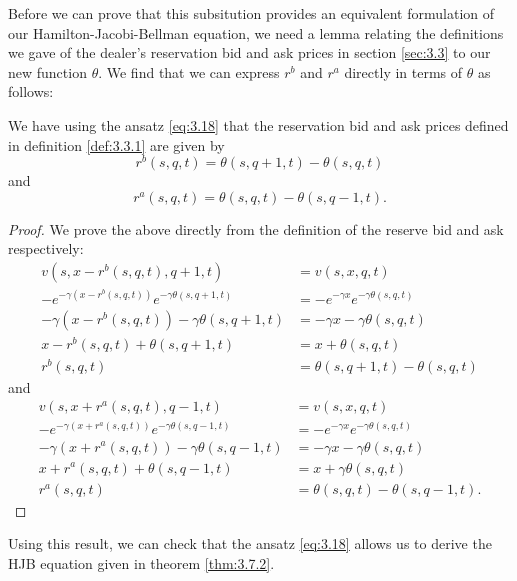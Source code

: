 Before we can prove that this subsitution provides an equivalent formulation of our
Hamilton-Jacobi-Bellman equation, we need a lemma relating the definitions we gave
of the dealer's reservation bid and ask prices in section \ref{sec:3.3} to our new
function $\theta$. We find that we can express $r^b$ and $r^a$ directly in terms of 
$\theta$ as follows:
\begin{lemma}\label{lem:3.7.3}
    We have using the ansatz \ref{eq:3.18} that the reservation bid and ask prices
    defined in definition \ref{def:3.3.1} are given by
    \begin{equation}
        r^b(s,q,t)=\theta(s,q+1,t)-\theta(s,q,t)
    \end{equation}
    and
    \begin{equation}
        r^a(s,q,t)=\theta(s,q,t)-\theta(s,q-1,t).
    \end{equation}
\end{lemma}
\begin{proof}
    We prove the above directly from the definition of the reserve bid and ask 
    respectively:
    \begin{align*}
        v(s,x-r^b(s,q,t),q+1,t)&=v(s,x,q,t)\\
        -e^{-\gamma(x-r^b(s,q,t))}e^{-\gamma\theta(s,q+1,t)}&=-e^{-\gamma x}e^{-\gamma\theta(s,q,t)}\\
        -\gamma(x-r^b(s,q,t))-\gamma\theta(s,q+1,t)&=-\gamma x-\gamma\theta(s,q,t)\\
        x-r^b(s,q,t)+\theta(s,q+1,t)&=x+\theta(s,q,t)\\
        r^b(s,q,t)&=\theta(s,q+1,t)-\theta(s,q,t)
    \end{align*}
    and
    \begin{align*}
        v(s,x+r^a(s,q,t),q-1,t)&=v(s,x,q,t)\\
        -e^{-\gamma(x+r^a(s,q,t))}e^{-\gamma\theta(s,q-1,t)}&=-e^{-\gamma x}e^{-\gamma\theta(s,q,t)}\\
        -\gamma(x+r^a(s,q,t))-\gamma\theta(s,q-1,t)&=-\gamma x-\gamma\theta(s,q,t)\\
        x+r^a(s,q,t)+\theta(s,q-1,t)&=x+\gamma\theta(s,q,t)\\
        r^a(s,q,t)&=\theta(s,q,t)-\theta(s,q-1,t).
    \end{align*}
\end{proof}

Using this result, we can check that the ansatz \ref{eq:3.18} allows us to derive 
the HJB equation given in theorem \ref{thm:3.7.2}.


